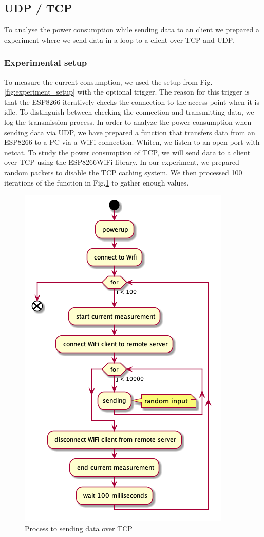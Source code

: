\subsection{UDP / TCP}
\label{udptcp:measure}
To analyse the power consumption while sending data to an client we prepared a 
experiment where we send data in a loop to a client over TCP and UDP.\\

\subsubsection{Experimental setup}
To measure the current consumption, we used the setup from Fig.\ref{fig:experiment_setup} 
with the optional trigger.
The reason for this trigger is that the ESP8266 iteratively checks the connection to the access point when it is idle.
To distinguish between checking the connection and transmitting data, we log the transmission process.
In order to analyze the power consumption when sending data via UDP,
we have prepared a function that transfers data from an ESP8266 to a PC via a WiFi connection.
Whiten, we listen to an open port with netcat. To study the power consumption of TCP,
we will send data to a client over TCP using the ESP8266WiFi library. In our experiment,
we prepared random packets to disable the TCP caching system.
We then processed 100 iterations of the function in Fig.\ref{fig:tcp_uml}
to gather enough values.
\begin{figure}[h]
\centering
\includegraphics[width = 0.7 \linewidth]{fig/udp_tcp/tcp_uml.png}
\caption{Process to sending data over TCP}
\label{fig:tcp_uml}
\end{figure}
